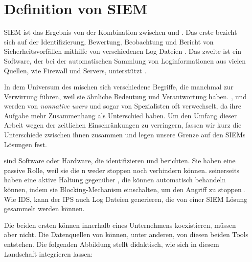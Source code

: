 \section{Definition von SIEM}

\gls{SIEM} ist das Ergebnis von der Kombination zwischen  und  \citep{Dorigo_SIEM}. Das erste bezieht sich auf der Identifizierung, Bewertung, Beobachtung und Bericht von Sicherheitsvorfällen mithilfe von verschiedenen Log Dateien \citep{techopedia_SEM}. Das zweite ist ein Software, der bei der automatischen Sammlung von Loginformationen aus vielen Quellen, wie Firewall und Servers, unterstützt \citep{techopedia_SIM}. 

In dem Universum des   mischen sich verschiedene Begriffe, die manchmal zur Verwirrung führen, weil sie ähnliche Bedeutung und Verantwortung haben. ,  und  werden von \textit{nonnative users} und sogar von Spezialisten oft verwechselt, da ihre Aufgabe mehr Zusammenhang als Unterschied haben. Um den Umfang dieser Arbeit wegen der zeitlichen Einschränkungen zu verringern, fassen wir kurz die Unterschiede zwischen ihnen zusammen und legen unsere Grenze auf den \glspl{SIEM} Lösungen fest.

 sind Software oder Hardware, die  identifizieren und berichten. Sie haben eine passive Rolle, weil sie die n weder stoppen noch verhindern können.  seinerseits haben eine aktive Haltung gegenüber , die können automatisch behandeln können, indem sie Blocking-Mechanism einschalten, um den Angriff zu stoppen \citep{Wendzel_IS}. Wie \gls{IDS}, kann der \gls{IPS} auch Log Dateien  generieren, die von einer \gls{SIEM} Lösung gesammelt werden können. 

Die beiden ersten können innerhalb eines Unternehmens koexistieren, müssen aber nicht. Die Datenquellen von  können, unter anderen, von diesen beiden Tools entstehen. Die folgenden Abbildung stellt didaktisch, wie sich  in diesem Landschaft integrieren lassen: 


